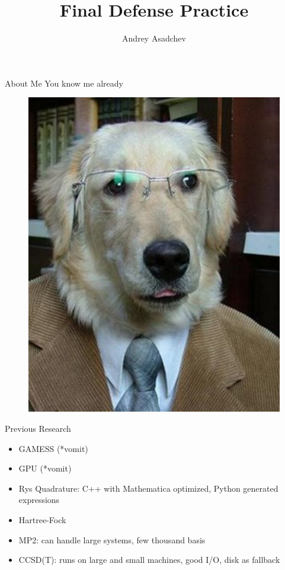 \documentclass{beamer}
\title[Group Meeting]{Final Defense Practice}
\author{ Andrey Asadchev}
\institute{VT.edu}
\begin{document}
\begin{frame}
  \titlepage
\end{frame}

\begin{frame}{About Me}
You know me already
\begin{figure}[here]
\begin{center}
\includegraphics[scale=0.5]{dog.pdf}
\end{center}
\end{figure}
\end{frame}



\begin{frame}{Previous Research}
\begin{itemize}
\item GAMESS (*vomit)
\item GPU (*vomit)
\item Rys Quadrature:  C++ with Mathematica optimized, Python generated expressions
\item Hartree-Fock
\item MP2:  can handle large systems, few thousand basis
\item CCSD(T):  runs on large and small machines, good I/O, disk as fallback
\end{itemize}
\end{frame}
\end{document}

